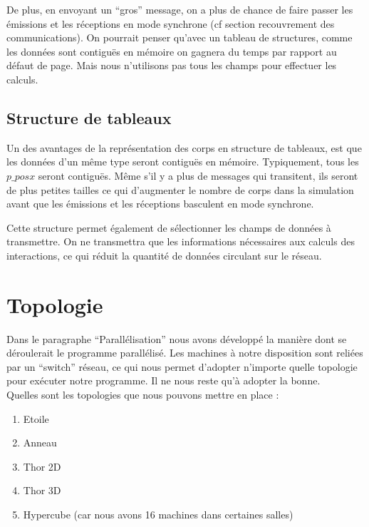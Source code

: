 \par De plus, en envoyant un ``gros'' message, on a plus de chance de faire passer les émissions
et les réceptions en mode synchrone (cf section recouvrement des communications). 
On pourrait penser qu'avec un tableau de structures, comme les données sont contiguës
en mémoire on gagnera du temps par rapport au défaut de page. Mais nous n'utilisons pas tous
 les champs pour effectuer les calculs.

\subsection{Structure de tableaux }

\par Un des avantages de la représentation des corps en structure de tableaux, est 
que les données d'un même type seront contiguës en mémoire. Typiquement, tous les
 $p\_posx$ seront contiguës. Même s'il y a plus de messages qui transitent, ils
seront de plus petites tailles ce qui d'augmenter le nombre de corps dans la simulation
avant que les émissions et les réceptions basculent en mode synchrone.\\

\par Cette structure permet également de sélectionner les champs de données à transmettre.  
On ne transmettra que les informations nécessaires aux calculs des interactions, ce qui réduit 
la quantité de données circulant sur le réseau.


\section{Topologie}

\par Dans le paragraphe ``Parallélisation'' nous avons développé la manière dont se déroulerait 
le programme parallélisé. Les machines à notre disposition sont reliées par un ``switch'' 
réseau, ce qui nous permet d'adopter n'importe quelle topologie pour exécuter notre 
programme. Il ne nous reste qu'à adopter la bonne.\\
Quelles sont les topologies que nous pouvons mettre en place :
\begin{enumerate}
\item Etoile
\item Anneau
\item Thor 2D
\item Thor 3D
\item Hypercube (car nous avons 16 machines dans certaines salles)
\end{enumerate}

